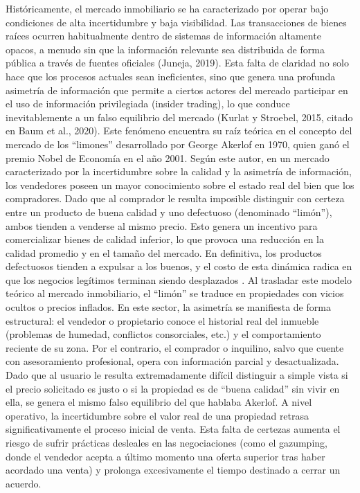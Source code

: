 Históricamente, el mercado inmobiliario se ha caracterizado por operar bajo condiciones de alta incertidumbre y baja visibilidad. Las transacciones de bienes raíces ocurren habitualmente dentro de sistemas de información altamente opacos, a menudo sin que la información relevante sea distribuida de forma pública a través de fuentes oficiales (Juneja, 2019). Esta falta de claridad no solo hace que los procesos actuales sean ineficientes, sino que genera una profunda asimetría de información que permite a ciertos actores del mercado participar en el uso de información privilegiada (insider trading), lo que conduce inevitablemente a un falso equilibrio del mercado (Kurlat y Stroebel, 2015, citado en Baum et al., 2020). Este fenómeno encuentra su raíz teórica en el concepto del mercado de los ``limones'' desarrollado por George Akerlof en 1970, quien ganó el premio Nobel de Economía en el año 2001. Según este autor, en un mercado caracterizado por la incertidumbre sobre la calidad y la asimetría de información, los vendedores poseen un mayor conocimiento sobre el estado real del bien que los compradores. Dado que al comprador le resulta imposible distinguir con certeza entre un producto de buena calidad y uno defectuoso (denominado ``limón''), ambos tienden a venderse al mismo precio. Esto genera un incentivo para comercializar bienes de calidad inferior, lo que provoca una reducción en la calidad promedio y en el tamaño del mercado. En definitiva, los productos defectuosos tienden a expulsar a los buenos, y el costo de esta dinámica radica en que los negocios legítimos terminan siendo desplazados \parencite{Akerlof1970}. Al trasladar este modelo teórico al mercado inmobiliario, el ``limón'' se traduce en propiedades con vicios ocultos o precios inflados. En este sector, la asimetría se manifiesta de forma estructural: el vendedor o propietario conoce el historial real del inmueble (problemas de humedad, conflictos consorciales, etc.) y el comportamiento reciente de su zona. Por el contrario, el comprador o inquilino, salvo que cuente con asesoramiento profesional, opera con información parcial y desactualizada. Dado que al usuario le resulta extremadamente difícil distinguir a simple vista si el precio solicitado es justo o si la propiedad es de ``buena calidad'' sin vivir en ella, se genera el mismo falso equilibrio del que hablaba Akerlof. A nivel operativo, la incertidumbre sobre el valor real de una propiedad retrasa significativamente el proceso inicial de venta. Esta falta de certezas aumenta el riesgo de sufrir prácticas desleales en las negociaciones (como el gazumping, donde el vendedor acepta a último momento una oferta superior tras haber acordado una venta) y prolonga excesivamente el tiempo destinado a cerrar un acuerdo.


